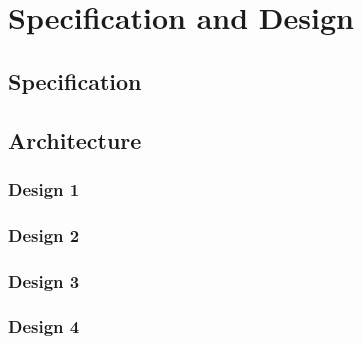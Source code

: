 \documentclass[12pt, conference, final, a4paper, onecolumn, compsoc]{IEEEtran}
\begin{document}
    \subsection*{}

    \section{Specification and Design}



    \subsection*{Specification}
    \paragraph{}

    \subsection*{Architecture}
    \subsubsection*{Design 1}
    \paragraph*{}

    \subsubsection*{Design 2}
    \paragraph{}

    \subsubsection*{Design 3}
    \paragraph{}

    \subsubsection*{Design 4}
\end{document}

